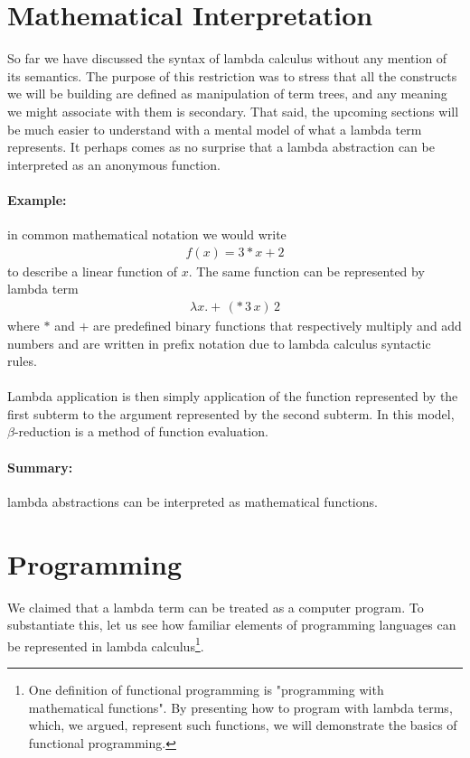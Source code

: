 \documentclass[11pt,twoside,a4paper]{article} %
\begin{document}
\section{Mathematical Interpretation}

So far we have discussed the syntax of lambda calculus without any mention of
its semantics. The purpose of this restriction was to stress that all the
constructs we will be building are defined as manipulation of term trees,
and any meaning we might associate with them is secondary. That said,
the upcoming sections will be much easier to understand with a mental model of
what a lambda term represents. It perhaps comes as no surprise that a lambda
abstraction can be interpreted as an anonymous function. 

\paragraph{Example:} in common mathematical notation we would write 
\begin{align*}
f(x)=3*x+2
\end{align*}
to describe a linear function of $x$. The same function can be represented by 
lambda term 
\begin{align*}
\lambda x.+\,(*\,3\,x)\,2
\end{align*}
where $*$ and $+$ are predefined binary 
functions that respectively multiply and add numbers and are written in prefix
notation due to lambda calculus syntactic rules.
\\\\
Lambda application is then simply application of the function represented by
the first subterm to the argument represented by the second subterm. In this
model, $\beta$-reduction is a method of function evaluation.

\paragraph{Summary:} lambda abstractions can be interpreted as mathematical 
functions.

\section{Programming}

We claimed that a lambda term can be treated as a computer program. To substantiate 
this, let us see how familiar elements of programming languages can be represented 
in lambda calculus\footnote{One definition of functional programming is 
"programming with mathematical functions". By presenting how to program with
lambda terms, which, we argued, represent such functions, we will demonstrate
the basics of functional programming.}.
\end{document}
